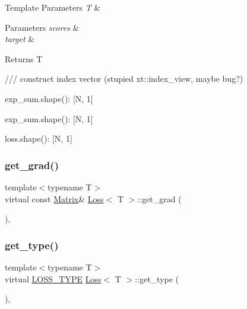 \begin{DoxyTemplParams}{Template Parameters}
{\em T} & \\
\hline
\end{DoxyTemplParams}

\begin{DoxyParams}{Parameters}
{\em scores} & \\
\hline
{\em target} & \\
\hline
\end{DoxyParams}
\begin{DoxyReturn}{Returns}
T 
\end{DoxyReturn}
/// construct index vector (stupied xt\+::index\+\_\+view, maybe bug?)

exp\+\_\+sum.\+shape()\+: \mbox{[}N, 1\mbox{]}

exp\+\_\+sum.\+shape()\+: \mbox{[}N, 1\mbox{]}

loss.\+shape()\+: \mbox{[}N, 1\mbox{]}\mbox{\label{class_loss_a20cbb31f5e0bb747ba6f8ee6ba25648c}} 
\subsubsection{\texorpdfstring{get\_grad()}{get\_grad()}}
{\footnotesize\ttfamily template$<$typename T$>$ \\
virtual const \mbox{\hyperlink{class_loss_a0cb2ca4ba669a18f628d747a995cd26c}{Matrix}}\& \mbox{\hyperlink{class_loss}{Loss}}$<$ T $>$\+::get\+\_\+grad (\begin{DoxyParamCaption}{ }\end{DoxyParamCaption})\hspace{0.3cm}{\ttfamily [inline]}, {\ttfamily [virtual]}}

\mbox{\label{class_loss_a17a1565bd927d068dbb5f556874e7ae7}} 
\subsubsection{\texorpdfstring{get\_type()}{get\_type()}}
{\footnotesize\ttfamily template$<$typename T$>$ \\
virtual \mbox{\hyperlink{loss_8hpp_a72b6675b9bd68360ebc6e54006d8220f}{L\+O\+S\+S\+\_\+\+T\+Y\+PE}} \mbox{\hyperlink{class_loss}{Loss}}$<$ T $>$\+::get\+\_\+type (\begin{DoxyParamCaption}{ }\end{DoxyParamCaption})\hspace{0.3cm}{\ttfamily [inline]}, {\ttfamily [virtual]}}



